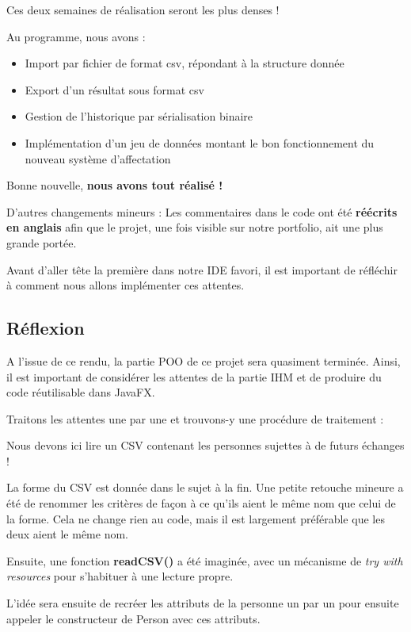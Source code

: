 \documentclass{mytex}
\begin{document}
Ces deux semaines de réalisation seront les plus denses !

Au programme, nous avons :

\begin{itemize}
	\item Import par fichier de format csv, répondant à la structure donnée
	\item Export d’un résultat sous format csv
	\item Gestion de l’historique par sérialisation binaire
	\item Implémentation d’un jeu de données montant le bon fonctionnement du nouveau système d’affectation
\end{itemize}

Bonne nouvelle, \textbf{nous avons tout réalisé !}

D'autres changements mineurs : 
Les commentaires dans le code ont été \textbf{réécrits en anglais} afin que le projet, une fois visible sur notre portfolio, ait une plus grande portée.

Avant d'aller tête la première dans notre IDE favori, il est important de réfléchir à comment nous allons implémenter ces attentes. 

\subsection{Réflexion}

A l'issue de ce rendu, la partie POO de ce projet sera quasiment terminée. Ainsi, il est important de considérer les attentes de la partie IHM et de produire du code réutilisable dans JavaFX.

Traitons les attentes une par une et trouvons-y une procédure de traitement : 


Nous devons ici lire un CSV contenant les personnes sujettes à de futurs échanges !

La forme du CSV est donnée dans le sujet à la fin.
Une petite retouche mineure a été de renommer les critères de façon à ce qu'ils aient le même nom que celui de la forme. Cela ne change rien au code, mais il est largement préférable que les deux aient le même nom.

Ensuite, une fonction \textbf{readCSV()} a été imaginée, avec un mécanisme de \textit{try with resources} pour s'habituer à une lecture propre.

L'idée sera ensuite de recréer les attributs de la personne un par un pour ensuite appeler le constructeur de Person avec ces attributs.
\end{document}
